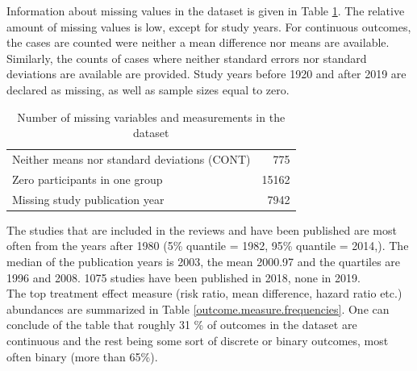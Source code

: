 \documentclass[11pt,a4paper,twoside]{book}\usepackage[]{graphicx}\usepackage[]{color}
\begin{document}
Information about missing values in the dataset is given in Table \ref{missing}. The relative amount of missing values is low, except for study years. For continuous outcomes, the cases are counted were neither a mean difference nor means are available. Similarly, the counts of cases where neither standard errors nor standard deviations are available are provided. Study years before 1920 and after 2019 are declared as missing, as well as sample sizes equal to zero.

\begin{table}[ht]
\centering
\begingroup\footnotesize
\begin{tabular}{lr}
  \hline
  \hline
Neither means nor standard deviations (CONT) & 775 \\ 
  Zero participants in one group & 15162 \\ 
  Missing study publication year & 7942 \\ 
   \hline
\end{tabular}
\endgroup
\caption{Number of missing variables and measurements in the dataset} 
\label{missing}
\end{table}


The studies that are included in the reviews and have been published are most often from the years after 1980 (5\% quantile = 1982, 95\% quantile = 2014,). The median of the publication years is 2003, the mean 2000.97 and the quartiles are 1996 and 2008. 1075 studies have been published in 2018, none in 2019. \\
The top treatment effect measure (risk ratio, mean difference, hazard ratio etc.) abundances are summarized in Table \ref{outcome.measure.frequencies}. One can conclude of the table that roughly 31 \% of outcomes in the dataset are continuous and the rest being some sort of discrete or binary outcomes, most often binary (more than 65\%).
\end{document}
